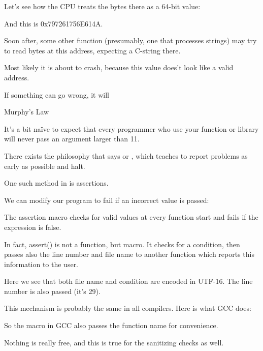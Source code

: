 Let's see how the CPU treats the bytes there as a 64-bit value:



And this is 0x797261756E614A.

Soon after, some other function (presumably, one that processes strings) may try to read bytes at 
this address, expecting a C-string there.

Most likely it is about to crash, because this value does't look like a valid address.


\epigraph{If something can go wrong, it will}{Murphy's Law}

It's a bit naïve to expect that every programmer who use your function or library will never pass
an argument larger than 11.

There exists the philosophy that says  or , 
which teaches to report problems as early as possible and halt.

One such method in \CCpp is assertions.

We can modify our program to fail if an incorrect value is passed:



The assertion macro checks for valid values at every function start and fails if the expression is false.



In fact, assert() is not a function, but macro. It checks for a condition, then passes also the line number and file
name to another function which reports this information to the user.

Here we see that both file name and condition are encoded in UTF-16.
The line number is also passed (it's 29).

This mechanism is probably the same in all compilers.
Here is what GCC does:



So the macro in GCC also passes the function name for convenience.

Nothing is really free, and this is true for the sanitizing checks as well.

